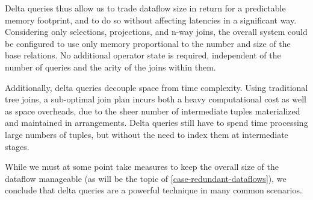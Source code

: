 \documentclass[../catalog.tex]{subfiles}
\begin{document}
Delta queries thus allow us to trade dataflow size in return for a
predictable memory footprint, and to do so without affecting latencies
in a significant way. Considering only selections, projections, and
n-way joins, the overall system could be configured to use only memory
proportional to the number and size of the base relations. No
additional operator state is required, independent of the number of
queries and the arity of the joins within them.

Additionally, delta queries decouple space from time complexity. Using
traditional tree joins, a sub-optimal join plan incurs both a heavy
computational cost as well as space overheads, due to the sheer number
of intermediate tuples materialized and maintained in
arrangements. Delta queries still have to spend time processing large
numbers of tuples, but without the need to index them at intermediate
stages.

While we must at some point take measures to keep the overall size of
the dataflow manageable (as will be the topic of
\autoref{case-redundant-dataflows}), we conclude that delta queries
are a powerful technique in many common scenarios.
\end{document}

